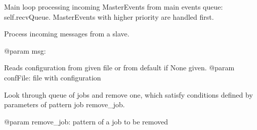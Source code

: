 \documentclass[a4paper,11pt,openany]{sphinxmanual}
\begin{document}
\begin{fulllineitems}
\begin{fulllineitems}
\label{ref-manual/XrdTestMaster:XrdTestMaster.XrdTestMaster.loadSuiteSessions}
\end{fulllineitems}


\begin{fulllineitems}
\label{ref-manual/XrdTestMaster:XrdTestMaster.XrdTestMaster.procEvents}
Main loop processing incoming MasterEvents from main events queue:
self.recvQueue. MasterEvents with higher priority are handled first.

\end{fulllineitems}


\begin{fulllineitems}
\label{ref-manual/XrdTestMaster:XrdTestMaster.XrdTestMaster.procSlaveMsg}
Process incoming messages from a slave.

@param msg:

\end{fulllineitems}


\begin{fulllineitems}
\label{ref-manual/XrdTestMaster:XrdTestMaster.XrdTestMaster.readConfig}
Reads configuration from given file or from default if None given.
@param confFile: file with configuration

\end{fulllineitems}


\begin{fulllineitems}
\label{ref-manual/XrdTestMaster:XrdTestMaster.XrdTestMaster.removeJob}
Look through queue of jobs and remove one, which satisfy conditions
defined by parameters of pattern job remove\_job.

@param remove\_job: pattern of a job to be removed

\end{fulllineitems}


\end{fulllineitems}
\end{document}
